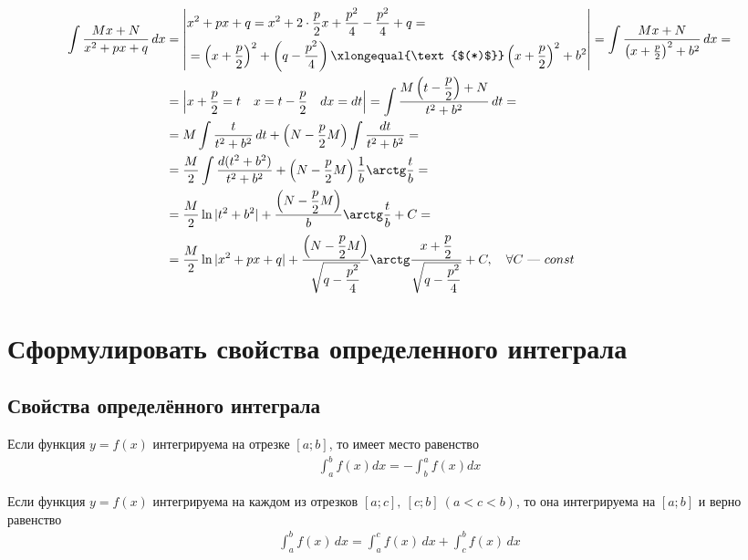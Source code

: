 \begin{align*}
    \int \frac{Mx + N}{x^2 + px + q}\, dx &= \left| \begin{aligned}
        & x^2 + px + q = x^2 + 2\cdot \frac{p}{2}x + \frac{p^2}{4} - \frac{p^2}{4} + q = \\
        & = \left(x + \frac{p}{2}\right)^2 + \left(q - \frac{p^2}{4}\right) \xlongequal{\text{$(*)$}} \left(x + \frac{p}{2}\right)^2  + b^2
    \end{aligned} \right| = \int \frac{Mx + N}{\left(x + \frac{p}{2}\right)^2 + b^2}\, dx = \\
     &= \left| x + \frac{p}{2} = t\quad x = t - \frac{p}{2}\quad dx = dt \right| = \int \frac{M \left(t - \dfrac{p}{2}\right) + N}{t^2 + b^2}\, dt = \\
     &=M \int \frac{t}{t^2 + b^2}\, dt + \left(N - \frac{p}{2}M\right) \int \frac{dt}{t^2 + b^2} = \\
     &= \frac{M}{2} \int \frac{d(t^2 + b^2)}{t^2 + b^2} + \left(N - \frac{p}{2}M\right) \frac{1}{b}\arctg \frac{t}{b} = \\
     &= \frac{M}{2} \ln |t^2 + b^2| + \frac{\left(N - \dfrac{p}{2}M\right)}{b} \arctg \frac{t}{b} + C = \\[0.5ex]
     &= \frac{M}{2} \ln |x^2 + px + q| + \frac{\left( N - \dfrac{p}{2}M\right)}{\sqrt{q - \dfrac{p^2}{4}}}\arctg \frac{x + \dfrac{p}{2}}{\sqrt{q - \dfrac{p^2}{4}}} + C,\quad \forall C \text{ --- } const
\end{align*}

\section{Сформулировать свойства определенного интеграла} 

\subsection{Свойства определённого интеграла}

\begin{theorem}
    Если функция $y=f(x)$ интегрируема на отрезке $[a;b]$, то имеет место равенство
    \begin{gather*}
        \boxed{\int_{a}^{b} f(x) dx = - \int_{b}^{a} f(x) dx}
    \end{gather*}
\end{theorem}

\begin{theorem}
    Если функция $y=f(x)$ интегрируема на каждом из отрезков $[a;c],\ [c;b]\ (a < c < b)$, то она интегрируема на $[a;b]$ и верно равенство
    \begin{gather*}
        \boxed{\int_{a}^{b} f(x)\, dx = \int_{a}^{c} f(x)\, dx + \int_{c}^{b} f(x)\, dx}
    \end{gather*}
\end{theorem}

